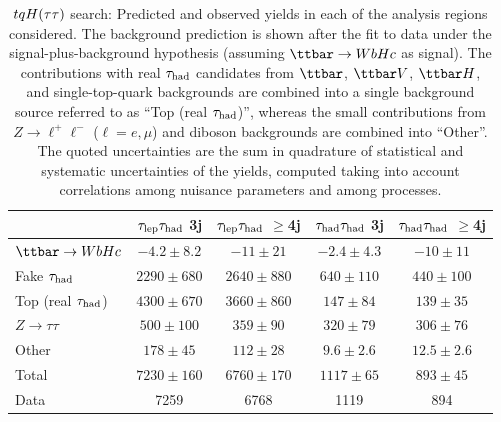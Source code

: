 \begin{table}[htbp]
\small
\begin{center}
\begin{tabular}{l*{4}{c}}
\hline\hline
 & $\tau_{\mathrm{lep}} \tau_{\mathrm{had}}$ 3j & $\tau_{\mathrm{lep}} \tau_{\mathrm{had}}$ $\geq$4j & $\tau_{\mathrm{had}} \tau_{\mathrm{had}}$ 3j &  $\tau_{\mathrm{had}} \tau_{\mathrm{had}}$ $\geq$4j \\
\hline
$\Hc$  &   $ -4.2 \pm 8.2 $ &   $ -11 \pm 21 $ &   $ -2.4 \pm 4.3 $ &   $ -10 \pm 11 $ \\ 
\hline
Fake $\tau_{\mathrm{had}}$  &   $ 2290 \pm 680 $ &   $ 2640 \pm 880 $ &   $ 640 \pm 110 $ &   $ 440 \pm 100 $ \\ 
Top (real $\tau_{\mathrm{had}}$)  &   $ 4300 \pm 670 $ &   $ 3660 \pm 860 $ &   $ 147 \pm 84 $ &   $ 139 \pm 35 $ \\ 
$Z \to \tau\tau$  &   $ 500 \pm 100 $ &   $ 359 \pm 90 $ &   $ 320 \pm 79 $ &   $ 306 \pm 76 $ \\ 
Other  &   $ 178 \pm 45 $ &   $ 112 \pm 28 $ &   $ 9.6 \pm 2.6 $ &   $ 12.5 \pm 2.6 $ \\ 
\hline
Total  &   $ 7230 \pm 160 $ &   $ 6760 \pm 170 $ &   $ 1117 \pm 65 $ &   $ 893 \pm 45 $ \\
\hline
Data & 7259  & 6768  & 1119  & 894 \\ 
\hline\hline    
\end{tabular}

%
\end{center}
\caption{
$tqH(\tau\tau)$ search: Predicted and observed yields in each of the analysis regions considered.
The background prediction is shown after the fit to data under the signal-plus-background hypothesis 
(assuming $\Hc$ as signal).
The contributions with real $\tau_{\mathrm{had}}$ candidates from $\ttbar$,  $\ttbar V$, $\ttbar H$, and single-top-quark backgrounds are combined into
a single background source referred to as ``Top (real $\tau_{\mathrm{had}}$)'', whereas the small contributions from 
$Z\to \ell^+\ell^-$ ($\ell = e, \mu$) and diboson backgrounds are combined into ``Other''. 
The quoted uncertainties are the sum in quadrature of statistical and systematic uncertainties of the yields, 
computed taking into account correlations among nuisance parameters and among processes.
}
\label{tab:Htautau_Postfit_Yields_Unblind_Hc}
\end{table} 

